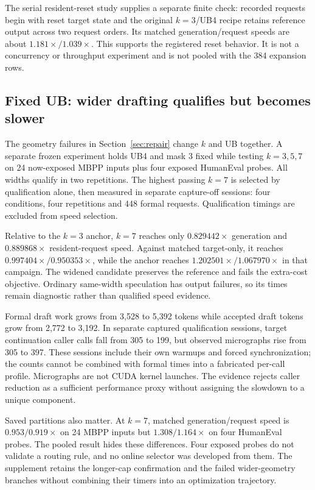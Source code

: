 The serial resident-reset study supplies a separate finite check: recorded requests begin with reset target state and the original $k=3$/UB4 recipe retains reference output across two request orders. Its matched generation/request speeds are about $1.181\times/1.039\times$. This supports the registered reset behavior. It is not a concurrency or throughput experiment and is not pooled with the 384 expansion rows.

\subsection{Fixed UB: wider drafting qualifies but becomes slower}
The geometry failures in Section~\ref{sec:repair} change $k$ and UB together. A separate frozen experiment holds UB4 and mask 3 fixed while testing $k=3,5,7$ on 24 now-exposed MBPP inputs plus four exposed HumanEval probes. All widths qualify in two repetitions. The highest passing $k=7$ is selected by qualification alone, then measured in separate capture-off sessions: four conditions, four repetitions and 448 formal requests. Qualification timings are excluded from speed selection.

Relative to the $k=3$ anchor, $k=7$ reaches only $0.829442\times$ generation and $0.889868\times$ resident-request speed. Against matched target-only, it reaches $0.997404\times/0.950353\times$, while the anchor reaches $1.202501\times/1.067970\times$ in that campaign. The widened candidate preserves the reference and fails the extra-cost objective. Ordinary same-width speculation has output failures, so its times remain diagnostic rather than qualified speed evidence.

Formal draft work grows from 3,528 to 5,392 tokens while accepted draft tokens grow from 2,772 to 3,192. In separate captured qualification sessions, target continuation caller calls fall from 305 to 199, but observed micrographs rise from 305 to 397. These sessions include their own warmups and forced synchronization; the counts cannot be combined with formal times into a fabricated per-call profile. Micrographs are not CUDA kernel launches. The evidence rejects caller reduction as a sufficient performance proxy without assigning the slowdown to a unique component.

Saved partitions also matter. At $k=7$, matched generation/request speed is $0.953/0.919\times$ on 24 MBPP inputs but $1.308/1.164\times$ on four HumanEval probes. The pooled result hides these differences. Four exposed probes do not validate a routing rule, and no online selector was developed from them. The supplement retains the longer-cap confirmation and the failed wider-geometry branches without combining their timers into an optimization trajectory.

